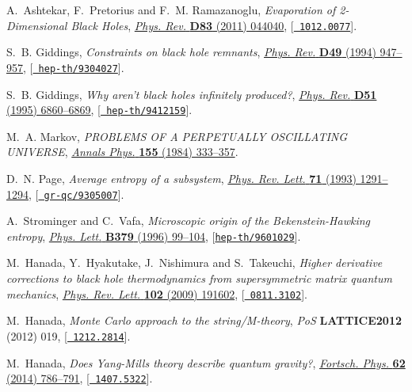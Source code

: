 \documentclass[12pt]{article}
\begin{document}
\begin{thebibliography}{100}
A.~Ashtekar, F.~Pretorius and F.~M. Ramazanoglu, \emph{{Evaporation of
  2-Dimensional Black Holes}},
  \href{http://dx.doi.org/10.1103/PhysRevD.83.044040}{\emph{Phys. Rev.} {\bf
  D83} (2011) 044040}, [\href{http://arxiv.org/abs/1012.0077}{{\tt
  1012.0077}}].

S.~B. Giddings, \emph{{Constraints on black hole remnants}},
  \href{http://dx.doi.org/10.1103/PhysRevD.49.947}{\emph{Phys. Rev.} {\bf D49}
  (1994) 947--957}, [\href{http://arxiv.org/abs/hep-th/9304027}{{\tt
  hep-th/9304027}}].

S.~B. Giddings, \emph{{Why aren't black holes infinitely produced?}},
  \href{http://dx.doi.org/10.1103/PhysRevD.51.6860}{\emph{Phys. Rev.} {\bf D51}
  (1995) 6860--6869}, [\href{http://arxiv.org/abs/hep-th/9412159}{{\tt
  hep-th/9412159}}].

M.~A. Markov, \emph{{PROBLEMS OF A PERPETUALLY OSCILLATING UNIVERSE}},
  \href{http://dx.doi.org/10.1016/0003-4916(84)90004-6}{\emph{Annals Phys.}
  {\bf 155} (1984) 333--357}.

D.~N. Page, \emph{{Average entropy of a subsystem}},
  \href{http://dx.doi.org/10.1103/PhysRevLett.71.1291}{\emph{Phys. Rev. Lett.}
  {\bf 71} (1993) 1291--1294}, [\href{http://arxiv.org/abs/gr-qc/9305007}{{\tt
  gr-qc/9305007}}].

A.~Strominger and C.~Vafa, \emph{{Microscopic origin of the Bekenstein-Hawking
  entropy}}, \href{http://dx.doi.org/10.1016/0370-2693(96)00345-0}{\emph{Phys.
  Lett.} {\bf B379} (1996) 99--104},
  [\href{http://arxiv.org/abs/hep-th/9601029}{{\tt hep-th/9601029}}].

M.~Hanada, Y.~Hyakutake, J.~Nishimura and S.~Takeuchi, \emph{{Higher derivative
  corrections to black hole thermodynamics from supersymmetric matrix quantum
  mechanics}},
  \href{http://dx.doi.org/10.1103/PhysRevLett.102.191602}{\emph{Phys. Rev.
  Lett.} {\bf 102} (2009) 191602}, [\href{http://arxiv.org/abs/0811.3102}{{\tt
  0811.3102}}].

M.~Hanada, \emph{{Monte Carlo approach to the string/M-theory}}, {\emph{PoS}
  {\bf LATTICE2012} (2012) 019}, [\href{http://arxiv.org/abs/1212.2814}{{\tt
  1212.2814}}].

M.~Hanada, \emph{{Does Yang-Mills theory describe quantum gravity?}},
  \href{http://dx.doi.org/10.1002/prop.201400047}{\emph{Fortsch. Phys.} {\bf
  62} (2014) 786--791}, [\href{http://arxiv.org/abs/1407.5322}{{\tt
  1407.5322}}].


\end{thebibliography}
\end{document}
